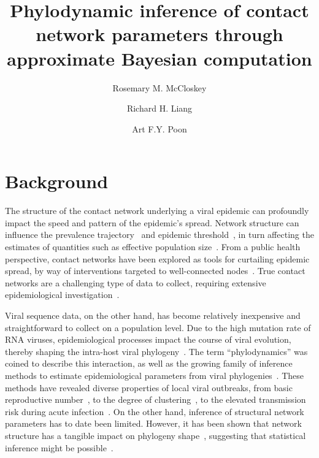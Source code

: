\documentclass[12pt]{article}\usepackage[]{graphicx}\usepackage[]{color}
\title{Phylodynamic inference of contact network parameters through approximate
Bayesian computation}
\author{Rosemary M. McCloskey \and Richard H. Liang \and Art F.Y. Poon}
\begin{document}
\maketitle

\section*{Background}

The structure of the contact network underlying a viral epidemic can profoundly
impact the speed and pattern of the epidemic's spread. Network structure can
influence the prevalence trajectory~\autocite{o2010contact} and epidemic
threshold~\autocite{barthelemy2005dynamical}, in turn affecting the estimates
of quantities such as effective population
size~\autocite{goodreau2006assessing}. From a public health perspective,
contact networks have been explored as tools for curtailing epidemic spread, by
way of interventions targeted to well-connected
nodes~\autocite{little2014using}. True contact networks are a challenging type
of data to collect, requiring extensive epidemiological
investigation~\autocite{welch2011statistical}.

Viral sequence data, on the other hand, has become relatively inexpensive and
straightforward to collect on a population level. Due to the high mutation rate
of RNA viruses, epidemiological processes impact the course of viral evolution,
thereby shaping the intra-host viral
phylogeny~\autocite{drummond2003measurably}. The term ``phylodynamics'' was
coined to describe this interaction, as well as the growing family of inference
methods to estimate epidemiological parameters from viral
phylogenies~\autocite{grenfell2004unifying}. These methods have revealed
diverse properties of local viral outbreaks, from basic reproductive
number~\autocite{stadler2011estimating}, to the degree of
clustering~\autocite{hughes2009molecular}, to the elevated transmission risk
during acute infection~\autocite{volz2012simple}. On the other hand, inference
of structural network parameters has to date been limited. However, it has been
shown that network structure has a tangible impact on phylogeny
shape~\autocite{leventhal2012inferring, colijn2014phylogenetic,
goodreau2006assessing, robinson2013dynamics}, suggesting that statistical
inference might be possible~\autocite{welch2011statistical}.
\end{document}
